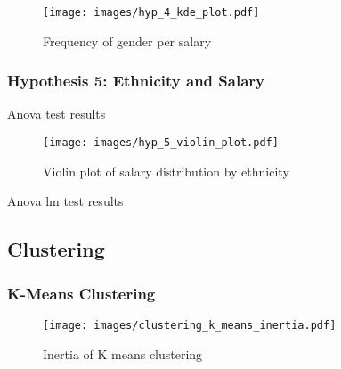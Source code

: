 \begin{figure}[H]
    \centering
    \texttt{[image: images/hyp\_4\_kde\_plot.pdf]} %
    \caption{Frequency of gender per salary}
    \label{fig:frequency of gender per salary}
\end{figure}

\subsubsection{Hypothesis 5: Ethnicity and Salary}

\begin{table}[H]
    \centering
    \caption{Anova test results}
    \label{tab:anova results}
    \begin{minipage}{\columnwidth}
        
    \end{minipage}
\end{table}

\begin{figure}[H]
    \centering
    \texttt{[image: images/hyp\_5\_violin\_plot.pdf]} %
    \caption{Violin plot of salary distribution by ethnicity}
    \label{fig:violin plot of salary distribution by ethnicity}
\end{figure}

\begin{table}[H]
    \centering
    \caption{Anova lm test results}
    \label{tab:anova lm results}
    \begin{minipage}{\columnwidth}
        
    \end{minipage}
\end{table}

\subsection{Clustering}

\subsubsection{K-Means Clustering}

\begin{figure}[H]
    \centering
    \texttt{[image: images/clustering\_k\_means\_inertia.pdf]} %
    \caption{Inertia of K means clustering}
    \label{fig:inertia of k means clustering}
\end{figure}

